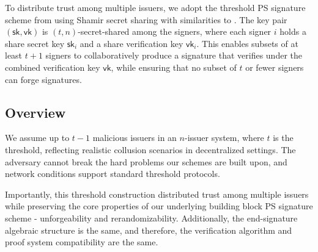 To distribute trust among multiple issuers, we adopt the threshold PS signature scheme from \cite{tomescu2022utt} using Shamir secret sharing with similarities to \cite{sonnino_coconut_2020}. The key pair $(\mathsf{sk}, \mathsf{vk})$ is $(t,n)$-secret-shared among the signers, where each signer $i$ holds a share secret key $\mathsf{sk}_i$ and a share verification key $\mathsf{vk}_i$. This enables subsets of at least $t+1$ signers to collaboratively produce a signature that verifies under the combined verification key $\mathsf{vk}$, while ensuring that no subset of $t$ or fewer signers can forge signatures.


\subsection{Overview}
We assume up to $t-1$ malicious issuers in an $n$-issuer system, where $t$ is the threshold, reflecting realistic collusion scenarios in decentralized settings. The adversary cannot break the hard problems our schemes are built upon, and network conditions support standard threshold protocols.


Importantly, this threshold construction distributed trust among multiple issuers while preserving the core properties of our underlying building block PS signature scheme - unforgeability and rerandomizability. Additionally, the end-signature algebraic structure is the same, and therefore, the verification algorithm and proof system compatibility are the same. 


